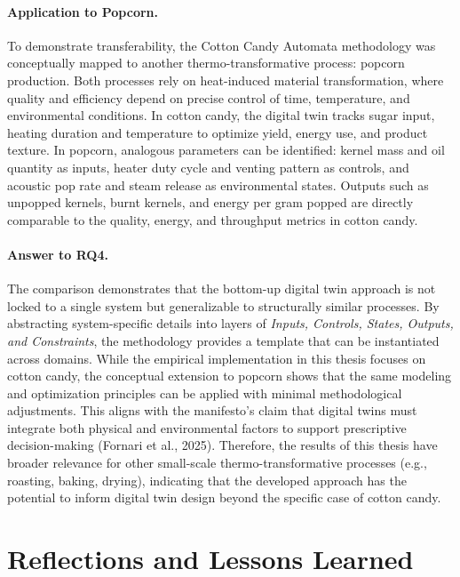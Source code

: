 \paragraph{Application to Popcorn.}
To demonstrate transferability, the Cotton Candy Automata methodology was conceptually mapped to another thermo-transformative process: popcorn production. Both processes rely on heat-induced material transformation, where quality and efficiency depend on precise control of time, temperature, and environmental conditions. In cotton candy, the digital twin tracks sugar input, heating duration and temperature to optimize yield, energy use, and product texture. In popcorn, analogous parameters can be identified: kernel mass and oil quantity as inputs, heater duty cycle and venting pattern as controls, and acoustic pop rate and steam release as environmental states. Outputs such as unpopped kernels, burnt kernels, and energy per gram popped are directly comparable to the quality, energy, and throughput metrics in cotton candy.

\paragraph{Answer to RQ4.}
The comparison demonstrates that the bottom-up digital twin approach is not locked to a single system but generalizable to structurally similar processes. By abstracting system-specific details into layers of \textit{Inputs, Controls, States, Outputs, and Constraints}, the methodology provides a template that can be instantiated across domains. While the empirical implementation in this thesis focuses on cotton candy, the conceptual extension to popcorn shows that the same modeling and optimization principles can be applied with minimal methodological adjustments. This aligns with the manifesto’s claim that digital twins must integrate both physical and environmental factors to support prescriptive decision-making (Fornari et al., 2025). Therefore, the results of this thesis have broader relevance for other small-scale thermo-transformative processes (e.g., roasting, baking, drying), indicating that the developed approach has the potential to inform digital twin design beyond the specific case of cotton candy.

\section{Reflections and Lessons Learned}
\label{sec:discussion:lessons}

